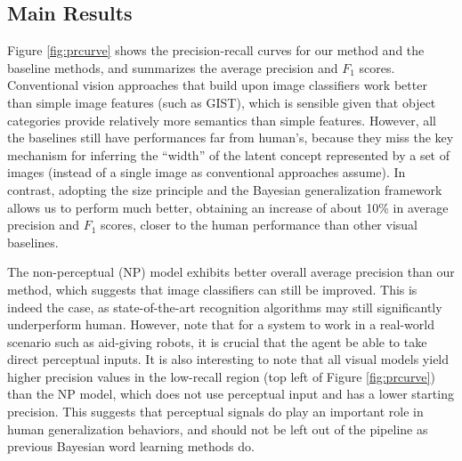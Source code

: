 \subsection{Main Results}
Figure \ref{fig:prcurve} shows the precision-recall curves for our method and the baseline methods, and summarizes the average precision and $F_1$ scores. Conventional vision approaches that build upon image classifiers work better than simple image features (such as GIST), which is sensible given that object categories provide relatively more semantics than simple features. However, all the baselines still have performances far from human's, because they miss the key mechanism for inferring the ``width'' of the latent concept represented by a set of images (instead of a single image as conventional approaches assume). In contrast, adopting the size principle and the Bayesian generalization framework allows us to perform much better, obtaining an increase of about 10\% in average precision and $F_1$ scores, closer to the human performance than other visual baselines.

The non-perceptual (NP) model exhibits better overall average precision than our method, which suggests that image classifiers can still be improved. This is indeed the case, as state-of-the-art recognition algorithms may still significantly underperform human. However, note that for a system to work in a real-world scenario such as aid-giving robots, it is crucial that the agent be able to take direct perceptual inputs. It is also interesting to note that all visual models yield higher precision values in the low-recall region (top left of Figure \ref{fig:prcurve}) than the NP model, which does not use perceptual input and has a lower starting precision. This suggests that perceptual signals do play an important role in human generalization behaviors, and should not be left out of the pipeline as previous Bayesian word learning methods do.

